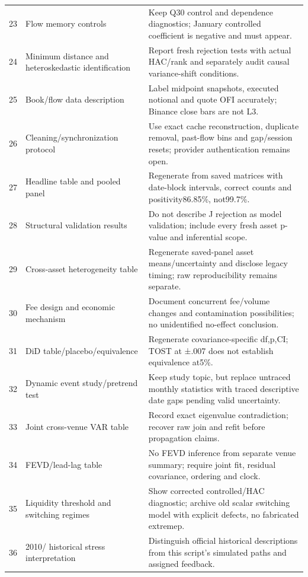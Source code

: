 \begin{longtable}{rp{}p{}}
23 & Flow memory controls & Keep Q30 control and dependence diagnostics; January controlled coefficient is negative and must appear.\\
24 & Minimum distance and heteroskedastic identification & Report fresh rejection tests with actual HAC/rank and separately audit causal variance-shift conditions.\\
25 & Book/\allowbreak flow data description & Label midpoint snapshots, executed notional and quote OFI accurately; Binance close bars are not L3.\\
26 & Cleaning/\allowbreak synchronization protocol & Use exact cache reconstruction, duplicate removal, past-flow bins and gap/session resets; provider authentication remains open.\\
27 & Headline table and pooled panel & Regenerate from saved matrices with date-block intervals, correct counts and positivity86.85\%, not99.7\%.\\
28 & Structural validation results & Do not describe J rejection as model validation; include every fresh asset p-value and inferential scope.\\
29 & Cross-asset heterogeneity table & Regenerate saved-panel asset means/uncertainty and disclose legacy timing; raw reproducibility remains separate.\\
30 & Fee design and economic mechanism & Document concurrent fee/volume changes and contamination possibilities; no unidentified no-effect conclusion.\\
31 & DiD table/\allowbreak placebo/\allowbreak equivalence & Regenerate covariance-specific df,p,CI; TOST at ±.007 does not establish equivalence at5\%.\\
32 & Dynamic event study/\allowbreak pretrend test & Keep study topic, but replace untraced monthly statistics with traced descriptive date gaps pending valid uncertainty.\\
33 & Joint cross-venue VAR table & Record exact eigenvalue contradiction; recover raw join and refit before propagation claims.\\
34 & FEVD/\allowbreak lead-lag table & No FEVD inference from separate venue summary; require joint fit, residual covariance, ordering and clock.\\
35 & Liquidity threshold and switching regimes & Show corrected controlled/HAC diagnostic; archive old scalar switching model with explicit defects, no fabricated extremep.\\
36 & 2010/\allowbreak 2014 historical stress interpretation & Distinguish official historical descriptions from this script’s simulated paths and assigned feedback.\\

\end{longtable}
